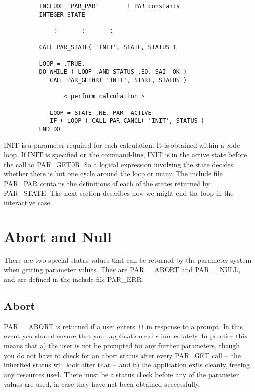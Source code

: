 \documentclass[twoside,11pt]{article}
\newcommand{\xlabel}[1]{}
\newcommand{\dash}{--}
\newcommand{\dash}{-}
\begin{document}
\begin{verbatim}
          INCLUDE 'PAR_PAR'        ! PAR constants
          INTEGER STATE

              :       :       :

          CALL PAR_STATE( 'INIT', STATE, STATUS )

          LOOP = .TRUE.
          DO WHILE ( LOOP .AND STATUS .EQ. SAI__OK )
             CALL PAR_GET0R( 'INIT', START, STATUS )

                 < perform calculation >

             LOOP = STATE .NE. PAR__ACTIVE
             IF ( LOOP ) CALL PAR_CANCL( 'INIT', STATUS )
          END DO
\end{verbatim}

INIT is a parameter required for each calculation.  It is obtained
within a code loop.  If INIT is specified on the command-line, INIT is
in the active state before the call to PAR\_GET0R.  So a logical
expression involving the state decides whether there is but one cycle
around the loop or many.  The include file PAR\_PAR contains the
definitions of each of the states returned by PAR\_STATE. The next
section describes how we might end the loop in the interactive case. 

\section{\xlabel{abort_and_null}Abort and Null}

There are two special status values that can be returned by the parameter
system when getting parameter values.  They are PAR\_\_ABORT and
PAR\_\_NULL, and are defined in the include file PAR\_ERR.

\subsection{\xlabel{abort}Abort}

PAR\_\_ABORT is returned if a user enters {\tt !!} in response to a
prompt.  In this event you should ensure that your application exits
immediately.  In practice this means that a) the user is not be prompted
for any further parameters, though you do not have to check for an abort
status after every PAR\_GET call \dash\ the inherited status will look after
that \dash\ and b) the application exits cleanly, freeing any resources used. 
There must be a status check before any of the parameter values are
used, in case they have not been obtained successfully.
\end{document}
